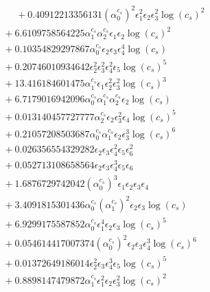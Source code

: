 \documentclass[10pt]{article}
\begin{document}
\begin{align*}
\phantom{F_{s,7}} &\phantom{={}}{}  + 0.40912213356131 \left(\alpha_{0}^{c_s}\right)^{2} \epsilon_{1}^{2} \epsilon_{2} \epsilon_{3}^{2} \log{\left(c_{s} \right)}^{2} \\
&{}  + 6.6109758564225 \alpha_{1}^{c_s} \alpha_{2}^{c_s} \epsilon_{1} \epsilon_{2} \log{\left(c_{s} \right)}^{2} \\
&{}  + 0.10354829297867 \alpha_{0}^{c_s} \epsilon_{2} \epsilon_{3} \epsilon_{4}^{4} \log{\left(c_{s} \right)} \\
&{}  + 0.20746010934642 \epsilon_{2}^{2} \epsilon_{3}^{2} \epsilon_{4}^{2} \epsilon_{5} \log{\left(c_{s} \right)}^{5} \\
&{}  + 13.416184601475 \alpha_{1}^{c_s} \epsilon_{1} \epsilon_{2}^{2} \epsilon_{3}^{2} \log{\left(c_{s} \right)}^{3} \\
&{}  + 6.7179016942096 \alpha_{0}^{c_s} \alpha_{1}^{c_s} \alpha_{2}^{c_s} \epsilon_{2} \log{\left(c_{s} \right)} \\
&{}  + 0.013140457727777 \alpha_{2}^{c_s} \epsilon_{2} \epsilon_{3}^{2} \epsilon_{4} \log{\left(c_{s} \right)}^{5} \\
&{}  + 0.21057208503687 \alpha_{0}^{c_s} \alpha_{1}^{c_s} \epsilon_{2} \epsilon_{3}^{3} \log{\left(c_{s} \right)}^{6} \\
&{}  + 0.026356554329282 \epsilon_{2} \epsilon_{3} \epsilon_{4}^{2} \epsilon_{5} \epsilon_{6}^{2} \\
&{}  + 0.052713108658564 \epsilon_{2} \epsilon_{3} \epsilon_{4}^{3} \epsilon_{5} \epsilon_{6} \\
&{}  + 1.6876729742042 \left(\alpha_{0}^{c_s}\right)^{3} \epsilon_{1} \epsilon_{2} \epsilon_{3} \epsilon_{4} \\
&{}  + 3.4091815301436 \alpha_{0}^{c_s} \left(\alpha_{1}^{c_s}\right)^{2} \epsilon_{2} \epsilon_{3} \log{\left(c_{s} \right)} \\
&{}  + 6.9299175587852 \alpha_{0}^{c_s} \epsilon_{1}^{4} \epsilon_{2} \epsilon_{3} \log{\left(c_{s} \right)}^{5} \\
&{}  + 0.054614417007374 \left(\alpha_{0}^{c_s}\right)^{2} \epsilon_{2} \epsilon_{3} \epsilon_{4}^{3} \log{\left(c_{s} \right)}^{6} \\
&{}  + 0.01372649186014 \epsilon_{2}^{2} \epsilon_{3} \epsilon_{4}^{3} \epsilon_{5} \log{\left(c_{s} \right)}^{5} \\
&{}  + 0.8898147479872 \alpha_{1}^{c_s} \epsilon_{1}^{2} \epsilon_{2} \epsilon_{3}^{2} \log{\left(c_{s} \right)}^{2} \\

\end{align*}
\end{document}
